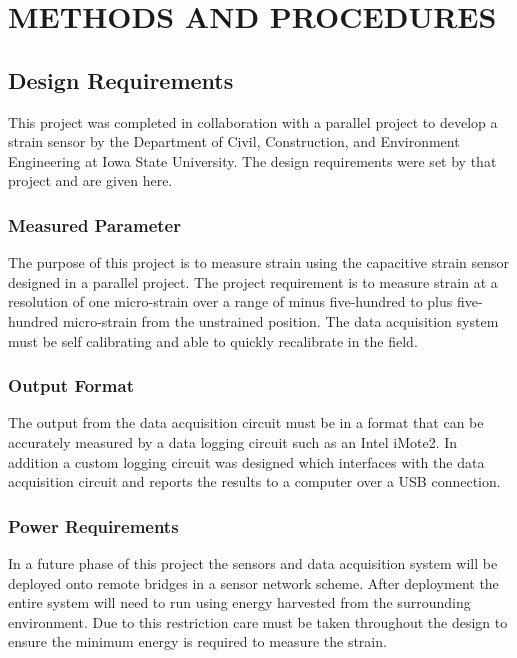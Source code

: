 \chapter{METHODS AND PROCEDURES}

\section {Design Requirements}
This project was completed in collaboration with a parallel project to develop a strain sensor by the Department of Civil, Construction, and Environment Engineering at Iowa State University.  The design requirements were set by that project and are given here.

\subsection{Measured Parameter}
The purpose of this project is to measure strain using the capacitive strain sensor designed in a parallel project.  The project requirement is to measure strain at a resolution of one micro-strain over a range of minus five-hundred to plus five-hundred micro-strain from the unstrained position.  The data acquisition system must be self calibrating and able to quickly recalibrate in the field.

\subsection{Output Format}
The output from the data acquisition circuit must be in a format that can be accurately measured by a data logging circuit such as an Intel iMote2.  In addition a custom logging circuit was designed which interfaces with the data acquisition circuit and reports the results to a computer over a USB connection.   

\subsection{Power Requirements}
In a future phase of this project the sensors and data acquisition system will be deployed onto remote bridges in a sensor network scheme.  After deployment the entire system will need to run using energy harvested from the surrounding environment.  Due to this restriction care must be taken throughout the design to ensure the minimum energy is required to measure the strain.


